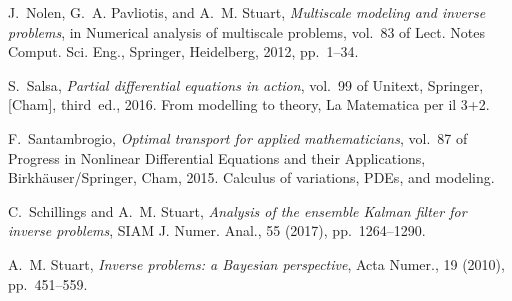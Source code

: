 \documentclass[10pt]{article}
\begin{document}
\begin{thebibliography}{10}
	{\sc J.~Nolen, G.~A. Pavliotis, and A.~M. Stuart}, {\em Multiscale modeling and
		inverse problems}, in Numerical analysis of multiscale problems, vol.~83 of
	Lect. Notes Comput. Sci. Eng., Springer, Heidelberg, 2012, pp.~1--34.
	
	{\sc S.~Salsa}, {\em Partial differential equations in action}, vol.~99 of
	Unitext, Springer, [Cham], third~ed., 2016.
	\newblock From modelling to theory, La Matematica per il 3+2.
	
	{\sc F.~Santambrogio}, {\em Optimal transport for applied mathematicians},
	vol.~87 of Progress in Nonlinear Differential Equations and their
	Applications, Birkh\"{a}user/Springer, Cham, 2015.
	\newblock Calculus of variations, PDEs, and modeling.
	
	{\sc C.~Schillings and A.~M. Stuart}, {\em Analysis of the ensemble {K}alman
		filter for inverse problems}, SIAM J. Numer. Anal., 55 (2017),
	pp.~1264--1290.
	
	{\sc A.~M. Stuart}, {\em Inverse problems: a {B}ayesian perspective}, Acta
	Numer., 19 (2010), pp.~451--559.
	
\end{thebibliography}
\end{document}
